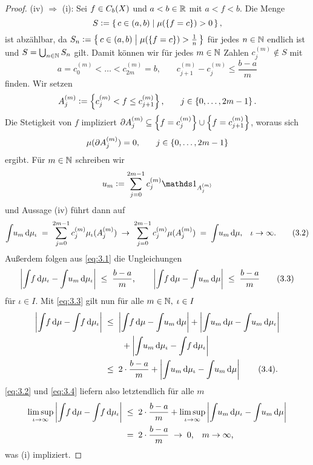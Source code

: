 \documentclass[../main/main.tex]{subfiles}
\begin{document}
\begin{proof}
		(iv) $\Rightarrow$ (i): Sei $f \in C_b(X)$ und $a < b \in \mathbb{R}$ 
		mit $a < f < b$. Die Menge
		$$S \vcentcolon = \left\{\, c \in (a, b) \; \middle| \; \mu(\left\{f = c\right\}) > 0 \,\right\} \text{,}$$
		ist abzählbar, da 
		$S_n \vcentcolon = \left\{\, c \in (a, b) \; \middle| \; \mu(\left\{f = c\right\}) > \frac{1}{n} \,\right\}$ 
		für jedes $n \in \mathbb{N}$ endlich ist und $S = \bigcup_{n \in \mathbb{N}} S_n$ gilt.
		Damit können wir für jedes $m \in \mathbb{N}$ Zahlen $c_j^{(m)} \notin S$ mit
		\[a = c_0^{(m)} < \dots < c_{2m}^{(m)} = 
		b \text{,} \qquad c_{j+1}^{(m)} - c_j^{(m)} \leq \frac{b-a}{m} 
		\label{eq:3.1} \tag{3.1}\]
		finden. Wir setzen
		$$A_j^{(m)} \vcentcolon = \left\{c_j^{(m)} < f \leq c_{j+1}^{(m)}\right\}\text{,}
		\qquad j \in \left\{0,\dots,2m-1\right\} \text{.}$$ 
		Die Stetigkeit von $f$ impliziert 
		$\partial A_j^{(m)} \subseteq \left\{f = c_j^{(m)}\right\} \cup \left\{f = c_{j+1}^{(m)}\right\}$, 
		woraus sich 
		$$\mu(\partial A_j^{(m)}) = 0 \text{,} \qquad j \in \left\{0,\dots,2m-1\right\}$$
		ergibt. Für $m \in \mathbb{N}$ schreiben wir
		$$u_m \defby \sum_{j=0}^{2m-1} c_j^{(m)} \indfct_{A_j^{(m)}}$$
		und Aussage (iv) führt dann auf
		\[\int_{} \, u_m \, \mathrm{d}\mu_\iota \; = \; \sum_{j=0}^{2m-1} c_j^{(m)} \mu_\iota(A_j^{(m)}) 
		\; \to \; \sum_{j=0}^{2m-1} c_j^{(m)} \mu(A_j^{(m)}) \; = \; 
		\int_{} \, u_m \, \mathrm{d}\mu \text{,} \quad \iota \to \infty \text{.} 
		\label{eq:3.2} \tag{3.2}\]
		Außerdem folgen aus \eqref{eq:3.1} die Ungleichungen
		\[\left| \int_{} \, f \, \mathrm{d}\mu_\iota - \int_{} \, u_m \, \mathrm{d}\mu_\iota \right| \; \leq \; 
		\frac{b-a}{m} \text{,} \qquad 
		\left| \int_{} \, f \, \mathrm{d}\mu - \int_{} \, u_m \, \mathrm{d}\mu \right| \; \leq \; 
		\frac{b-a}{m} \label{eq:3.3} \tag{3.3}\]
		für $\iota \in I$.
		Mit \eqref{eq:3.3} gilt nun für alle $m \in \mathbb{N}, \; \iota \in I$
		\begin{align*}
			\left| \int_{} \, f \, \mathrm{d}\mu - \int_{} \, f \, \mathrm{d}\mu_\iota \right| \; &\leq \; 
			\left| \int_{} \, f \, \mathrm{d}\mu - \int_{} \, u_m \, \mathrm{d}\mu \right| + 
			\left| \int_{} \, u_m \, \mathrm{d}\mu - \int_{} \, u_m \, \mathrm{d}\mu_\iota \right| \\ & \qquad + 
			\left| \int_{} \, u_m \, \mathrm{d}\mu_\iota - \int_{} \, f \, \mathrm{d}\mu_\iota \right| \\
			&\leq \; 2 \cdot \frac{b-a}{m} + \left| \int_{} \, u_m \, \mathrm{d}\mu_\iota - 
			\int_{} \, u_m \, \mathrm{d}\mu \right| \label{eq:3.4} \tag{3.4}\text{.}
		\end{align*}
		\eqref{eq:3.2} und \eqref{eq:3.4} liefern also letztendlich für alle $m$
		\begin{align*}
			\limsup_{\iota \to \infty} \left| \int_{} \, f \, \mathrm{d}\mu - 
			\int_{} \, f \, \mathrm{d}\mu_\iota \right|
			\; &\leq \; 2 \cdot \frac{b-a}{m} + 
			\limsup_{\iota \to \infty} \left| \int_{} \, u_m \, \mathrm{d}\mu_\iota - 
			\int_{} \, u_m \, \mathrm{d}\mu \right| \\
			&= \; 2 \cdot \frac{b-a}{m} \; \to \; 0 \text{,} 
			\quad m \to \infty \text{,}
		\end{align*}
		was (i) impliziert.
	\end{proof}
\end{document}
